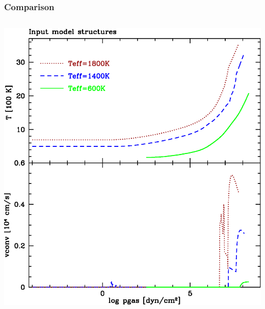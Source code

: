 \documentclass[14pt]{beamer}
\begin{document}
\begin{frame}
  \frametitle{Comparison}
  \begin{columnsonlytextwidth}
    \begin{column}{0.35\textwidth}
      \centering
      \includegraphics[width=\columnwidth]{InputStructure}
    \end{column}
    \begin{column}{0.6\textwidth}
      \centering

\end{column}
\end{columnsonlytextwidth}
\end{frame}
\end{document}
